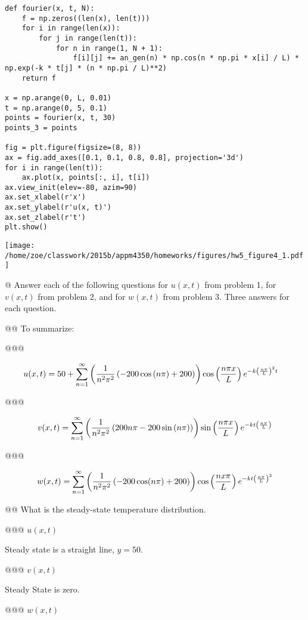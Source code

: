 \documentclass[10pt]{article}
\begin{document}
\begin{easylist}[enumerate]
\begin{verbatim}
def fourier(x, t, N):
    f = np.zeros((len(x), len(t)))
    for i in range(len(x)):
        for j in range(len(t)):
            for n in range(1, N + 1):
                f[i][j] += an_gen(n) * np.cos(n * np.pi * x[i] / L) *
np.exp(-k * t[j] * (n * np.pi / L)**2)
    return f

x = np.arange(0, L, 0.01)
t = np.arange(0, 5, 0.1)
points = fourier(x, t, 30)
points_3 = points

fig = plt.figure(figsize=(8, 8))
ax = fig.add_axes([0.1, 0.1, 0.8, 0.8], projection='3d')
for i in range(len(t)):
    ax.plot(x, points[:, i], t[i])
ax.view_init(elev=-80, azim=90)
ax.set_xlabel(r'x')
ax.set_ylabel(r'u(x, t)')
ax.set_zlabel(r't')
plt.show()
\end{verbatim}
\texttt{[image: /home/zoe/classwork/2015b/appm4350/homeworks/figures/hw5\_figure4\_1.pdf]}

\noweave

    \newpage
    @ Answer each of the following questions for $u(x, t)$ from problem 1, for $v(x, t)$ from problem 2, and for $w(x,
    t)$ from problem 3. Three answers for each question.

    @@ To summarize:

    @@@

    \begin{align*}
        u(x, t) &= 50 + \sum_{n = 1}^\infty \left( \frac{1}{n^{2} \pi^{2}} \left(- 200 \cos{\left (n \pi \right )} + 200\right) \right) \cos\left( \frac{n\pi x}{L} \right) e^{-k{\left( \frac{n \pi}{L} \right)}^2t}
    \end{align*}

    @@@

    \[
        v(x, t) = \sum_{n=1}^\infty \left( \frac{1}{n^{2} \pi^{2}} \left(200 n \pi - 200 \sin{\left (n \pi \right)}\right) \right) \sin\left( \frac{n\pi x}{L} \right) e^{-kt \left( \frac{n \pi}{L} \right)}
    \]

    @@@

    \[
        w(x, t) = \sum_{n=1}^\infty \left( \frac{1}{n^2\pi^2} \left( -200\cos(n\pi) + 200 \right) \right) \cos\left( \frac{nx\pi}{L} \right)e^{-kt\left( \frac{n\pi}{L} \right)^2}
    \]

    @@ What is the steady-state temperature distribution.

    @@@ $u(x, t)$

    Steady state is a straight line, $y=50$.

    @@@ $v(x, t)$

    Steady State is zero.

    @@@ $w(x, t)$


\end{easylist}
\end{document}

